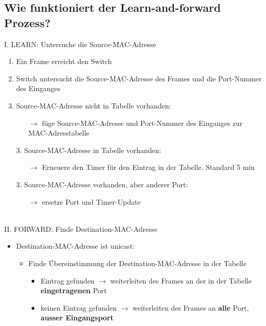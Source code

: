 \subsection*{Wie funktioniert der \flqq Learn-and-forward\frqq{} Prozess?}
I. LEARN: Untersuche die Source-MAC-Adresse
\begin{enumerate}
    \item Ein Frame erreicht den Switch
    \item Switch untersucht die Source-MAC-Adresse des Frames und die Port-Nummer des Einganges
    \item Source-MAC-Adresse nicht in Tabelle vorhanden:
    \begin{itemize}
        \item[$\rightarrow$] füge Source-MAC-Adresse und Port-Nummer des Einganges zur MAC-Adresstabelle
    \end{itemize}
    \item[3.] Source-MAC-Adresse in Tabelle vorhanden:
    \begin{itemize}
        \item[$\rightarrow$] Erneuere den Timer für den Eintrag in der Tabelle. Standard 5 min
    \end{itemize}
    \item[3.] Source-MAC-Adresse vorhanden, aber anderer Port:
    \begin{itemize}
        \item[$\rightarrow$] ersetze Port und Timer-Update
    \end{itemize}
\end{enumerate}\,\\[1em]

\newpage
II. FORWARD: Finde Destination-MAC-Adresse
\begin{itemize}
    \item Destination-MAC-Adresse ist unicast:
    \begin{itemize}
        \item Finde Übereinstimmung der Destination-MAC-Adresse in der Tabelle
        \begin{itemize}
            \item Eintrag gefunden $\rightarrow$ weiterleiten des Frames an der in der Tabelle \textbf{eingetragenen} Port
            \item keinen Eintrag gefunden $\rightarrow$ weiterleiten des Frames an \textbf{alle} Port, \textbf{ausser Eingangsport}
        \end{itemize}
    \end{itemize}
\end{itemize}

